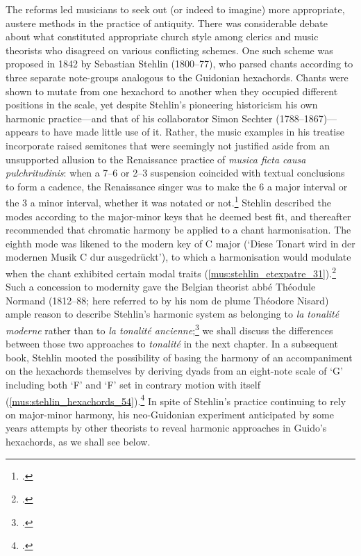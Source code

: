 %
The reforms led musicians to seek out (or indeed to imagine) more appropriate, austere methods in the practice of antiquity.
There was considerable debate about what constituted appropriate church style among clerics and music theorists who disagreed on various conflicting schemes.
One such scheme was proposed in 1842 by Sebastian Stehlin (1800--77), who parsed chants according to three separate note-groups analogous to the Guidonian hexachords.
Chants were shown to mutate from one hexachord to another when they occupied different positions in the scale, yet despite Stehlin's pioneering historicism his own harmonic practice---and that of his collaborator Simon Sechter (1788--1867)---appears to have made little use of it.
Rather, the music examples in his treatise incorporate raised semitones that were seemingly not justified aside from an unsupported allusion to the Renaissance practice of \emph{musica ficta causa pulchritudinis}: when a 7--6 or 2--3 suspension coincided with textual conclusions to form a cadence, the Renaissance singer was to make the 6 a major interval or the 3 a minor interval, whether it was notated or not.\footcite[84, 96]{BentMusicaRectaMusica1972}
Stehlin described the modes according to the major-minor keys that he deemed best fit, and thereafter recommended that chromatic harmony be applied to a chant harmonisation.
The eighth mode was likened to the modern key of C major (`Diese Tonart wird in der modernen Musik C dur ausgedrückt'), to which a harmonisation would modulate when the chant exhibited certain modal traits (\cref{mus:stehlin_etexpatre_31}).\footcite[pp.~iii--iv, 11 and `Beilage' p.~31]{StehlinTonartenChoralgesangesnach1842}
%
Such a concession to modernity gave the Belgian theorist abbé Théodule Normand (1812--88; here referred to by his nom de plume Théodore Nisard) ample reason to describe Stehlin's harmonic system as belonging to \emph{la tonalité moderne} rather than to \emph{la tonalité ancienne};\footcite[col.~88]{NisardAccompagnementplainchant1854} we shall discuss the differences between those two approaches to \emph{tonalité} in the next chapter.
%
In a subsequent book, Stehlin mooted the possibility of basing the harmony of an accompaniment on the hexachords themselves by deriving dyads from an eight-note scale of `G' including both `F'\kern 1pt\natural{} and `F'\kern 1pt\sharp{} set in contrary motion with itself (\cref{mus:stehlin_hexachords_54}).\footcite[54]{StehlinNaturgesetzeimTonreiche1852}
In spite of Stehlin's practice continuing to rely on major-minor harmony, his neo-Guidonian experiment anticipated by some years attempts by other theorists to reveal harmonic approaches in Guido's hexachords, as we shall see below.

